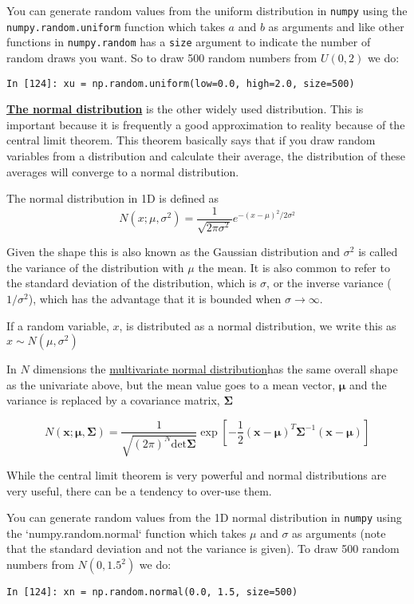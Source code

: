\documentclass[a4paper,10pt]{article}
\newcommand{\link}[2]{{\color{blue}\href{#1}{#2}}}
\begin{document}
You can generate random values from the uniform distribution in \texttt{numpy} using the \texttt{numpy.random.uniform} function which takes $a$ and $b$ as arguments and like other functions in \texttt{numpy.random} has a \texttt{size} argument to indicate the number of random draws you want. So to draw 500 random numbers from $U(0, 2)$ we do:
\begin{lstlisting}
In [124]: xu = np.random.uniform(low=0.0, high=2.0, size=500)
\end{lstlisting}



\link{https://en.wikipedia.org/wiki/Normal_distribution}{\textbf{The normal distribution}} is the other widely used distribution. This is important because it is frequently a good approximation to reality because of the central limit theorem. This theorem basically says that if you draw random variables from a distribution and calculate their average, the distribution of these averages will converge to a normal distribution.

The normal distribution in 1D is defined as
$$N(x; \mu, \sigma^2)= \frac{1}{\sqrt{2\pi {\sigma^2}}} e^{-(x-\mu)^2/2\sigma^2}$$

Given the shape this is also known as the Gaussian distribution and $\sigma^2$ is called the variance of the distribution with $\mu$ the mean. It is also common to refer to the standard deviation of the distribution, which is $\sigma$, or the inverse variance ($1/\sigma^2$), which has the advantage that it is bounded when $\sigma \to \infty$.

If a random variable, $x$, is distributed as a normal distribution, we write this as $x\sim N(\mu, \sigma^2)$

In $N$ dimensions the \link{https://en.wikipedia.org/wiki/Multivariate_normal_distribution}{multivariate normal distribution}has the same overall shape as the univariate above, but the mean value goes to a mean vector, $\mathbf{\mu}$ and the variance is replaced by a covariance matrix, $\bm{\Sigma}$


$$N(\mathbf{x}; \mathbf{\mu}, \bm{\Sigma})= \frac{1}{\sqrt{ (2\pi)^N \mathrm{det} \bm{\Sigma}}} \exp \left[-\frac{1}{2} (\mathbf{x} - \boldsymbol{\mu})^T  \bm{\Sigma}^{-1} (\mathbf{x} - \boldsymbol{\mu})  \right] $$


While the central limit theorem is very powerful and normal distributions are very useful, there can be a tendency to over-use them.

You can generate random values from the 1D normal distribution in \texttt{numpy} using the `numpy.random.normal` function which takes $\mu$ and $\sigma$ as arguments (note that the standard deviation and not the variance is given). To draw 500 random numbers from $N(0, 1.5^2)$ we do:
\begin{lstlisting}
In [124]: xn = np.random.normal(0.0, 1.5, size=500)
\end{lstlisting}
\end{document}
